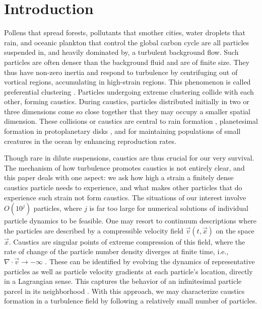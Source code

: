 \section{Introduction} 
Pollens that spread forests, pollutants that smother cities, water droplets that rain, and oceanic plankton that control the global carbon cycle are all particles suspended in, and heavily dominated by, a turbulent background flow. Such particles are often denser than the background fluid and are of finite size. They thus have non-zero inertia and respond to turbulence by centrifuging out of vortical regions, accumulating in high-strain regions. This phenomenon is called preferential clustering \cite{crowe1985,balkovsky2001,calzavarini2008a}. Particles undergoing extreme clustering collide with each other, forming caustics. During caustics, particles distributed initially in two or three dimensions come so close together that they may occupy a smaller spatial dimension. These collisions or caustics are central to rain formation \cite{falkovich2002,shaw2003,wilkinson2006,pumir2016}, planetesimal formation in protoplanetary disks \cite{guttler2010,schrapler2011,wada2013,birnstiel2024}, and for maintaining populations of small creatures in the ocean by enhancing reproduction rates.

Though rare in dilute suspensions, caustics are thus crucial for our very survival. The mechanism of how turbulence promotes caustics is not entirely clear, and this paper deals with one aspect: we ask how high a strain a finitely dense caustics particle needs to experience, and what makes other particles that do experience such strain not form caustics.
The situations of our interest involve $O(10^j)$ particles, where $j$ is far too large for numerical solutions of individual particle dynamics to be feasible. One may resort to continuum descriptions where the particles are described by a compressible velocity field $\vec{v}(t,\vec{x})$ on the space $\vec{x}$. Caustics are singular points of extreme compression of this field, where the rate of change of the particle number density diverges at finite time, i.e., $\nabla \cdot \vec{v} \to -\infty$ \cite{falkovich2002}. 
These can be identified by evolving the dynamics of representative particles as well as particle velocity gradients at each particle's location, directly in a Lagrangian sense. This captures the behavior of an infinitesimal particle parcel in its neighborhood \cite{falkovich2002,meibohm2021}. With this approach, we may characterize caustics formation in a turbulence field by following a relatively small number of particles.


